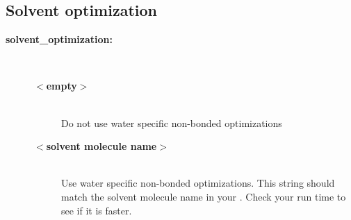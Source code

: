 \subsection{Solvent optimization}
\begin{description}
\item[{\bf solvent\_optimization:}]\mbox{}\\
\vspace{-2ex}\begin{description}
\item[{\bf $<$empty$>$}]\mbox{}\\
Do not use water specific non-bonded optimizations
\item[{\bf $<$solvent molecule name$>$}]\mbox{}\\
Use water specific non-bonded optimizations. This string should match the
solvent molecule name in your . Check your run time to see 
if it is faster. 
\end{description}
\end{description}

